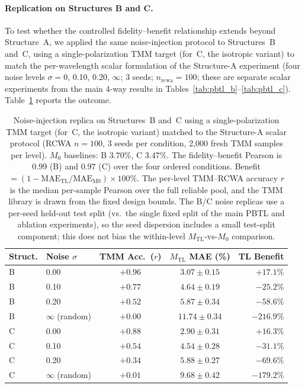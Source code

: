 \documentclass[a4paper,fleqn]{cas-sc}
\newcommand{\Mzero}{M_0}
\newcommand{\Mtl}{M_\text{TL}}
\newcommand{\MAE}{\text{MAE}}
\begin{document}
\paragraph{Replication on Structures B and C.} To test whether the controlled fidelity--benefit relationship extends beyond Structure~A, we applied the same noise-injection protocol to Structures~B and~C, using a single-polarization TMM target (for~C, the isotropic variant) to match the per-wavelength scalar formulation of the Structure-A experiment (four noise levels $\sigma = 0$, 0.10, 0.20, $\infty$; 3 seeds; $n_\text{rcwa}=100$; these are separate scalar experiments from the main 4-way results in Tables~\ref{tab:pbtl_b}--\ref{tab:pbtl_c}). Table~\ref{tab:tmm_noise_BC} reports the outcome.

\begin{table}[htbp]\centering\small
\caption{Noise-injection replica on Structures~B and~C using a single-polarization TMM target (for~C, the isotropic variant) matched to the Structure-A scalar protocol (RCWA $n=100$, 3 seeds per condition, 2{,}000 fresh TMM samples per level). $\Mzero$ baselines: B $3.70\%$, C $3.47\%$. The fidelity--benefit Pearson is $0.99$ (B) and $0.97$ (C) over the four ordered conditions. Benefit $=(1-\MAE_\text{TL}/\MAE_\text{M0})\times100\%$. The per-level TMM--RCWA accuracy $r$ is the median per-sample Pearson over the full reliable pool, and the TMM library is drawn from the fixed design bounds. The B/C noise replicas use a per-seed held-out test split (vs.\ the single fixed split of the main PBTL and ablation experiments), so the seed dispersion includes a small test-split component; this does not bias the within-level $\Mtl$-vs-$\Mzero$ comparison.}
\label{tab:tmm_noise_BC}
\begin{tabular}{llccr}\toprule
\textbf{Struct.} & \textbf{Noise $\sigma$} & \textbf{TMM Acc.\ ($r$)} & $\Mtl$ \textbf{MAE (\%)} & \textbf{TL Benefit}\\\midrule
B & 0.00               & $+0.96$ & $3.07 \pm 0.15$ & $+17.1\%$\\
B & 0.10               & $+0.77$ & $4.64 \pm 0.19$ & $-25.2\%$\\
B & 0.20               & $+0.52$ & $5.87 \pm 0.34$ & $-58.6\%$\\
B & $\infty$ (random)  & $+0.00$ & $11.74 \pm 0.34$ & $-216.9\%$\\\midrule
C & 0.00               & $+0.88$ & $2.90 \pm 0.31$ & $+16.3\%$\\
C & 0.10               & $+0.54$ & $4.54 \pm 0.28$ & $-31.1\%$\\
C & 0.20               & $+0.34$ & $5.88 \pm 0.27$ & $-69.6\%$\\
C & $\infty$ (random)  & $+0.01$ & $9.68 \pm 0.42$ & $-179.2\%$\\\bottomrule
\end{tabular}
\end{table}
\end{document}
